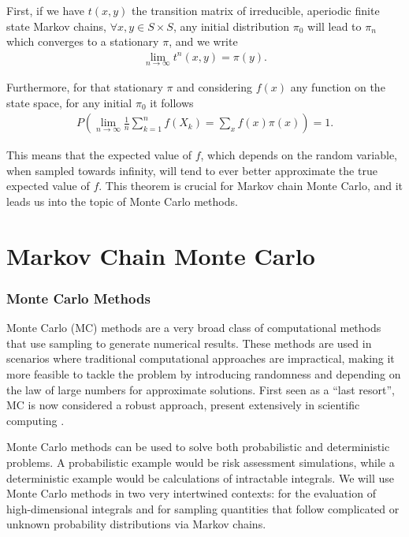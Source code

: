 First, if we have $t(x,y)$ the transition matrix of irreducible, aperiodic finite state Markov chains, $\forall x,y \in S \times S$, any initial distribution $\pi_0$ will lead to $\pi_n$ which converges to a stationary $\pi$, and we write 
 \begin{align}
     \lim_{n \to \infty} t^{n}(x, y) = \pi(y).
     \label{eq:chain_convergence1}
 \end{align}

Furthermore, for that stationary $\pi$ and considering $f(x)$ any function on the state space, for any initial $\pi_0$ it follows
\begin{align}
 P\left(\lim_{n \to \infty} \frac{1}{n}\sum_{k=1}^n f(X_k) = \sum_x f(x)\pi(x)\right) = 1.
 \label{eq:chain_convergence2}
\end{align}

This means that the expected value of $f$, which depends on the random variable, when sampled towards infinity, will tend to ever better approximate the true expected value of $f$. This theorem is crucial for Markov chain Monte Carlo, and it leads us into the topic of Monte Carlo methods.


\section{Markov Chain Monte Carlo}

\subsubsection{Monte Carlo Methods}
Monte Carlo (MC) methods are a very broad class of computational methods that use sampling to generate numerical results. These methods are used in scenarios where traditional computational approaches are impractical, making it more feasible to tackle the problem by introducing randomness and depending on the law of large numbers for approximate solutions. First seen as a ``last resort'', MC is now considered a robust approach, present extensively in scientific computing \cite{whyMC}.

Monte Carlo methods can be used to solve both probabilistic and deterministic problems. A probabilistic example would be risk assessment simulations, while a deterministic example would be calculations of intractable integrals. We will use Monte Carlo methods in two very intertwined contexts: for the evaluation of high-dimensional integrals and for sampling quantities that follow complicated or unknown probability distributions via Markov chains.

